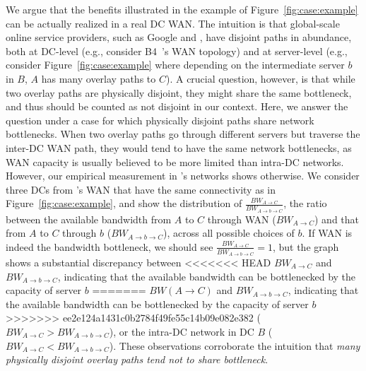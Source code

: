 We argue that the benefits illustrated in the example of
Figure~\ref{fig:case:example} can be actually realized in a
real DC WAN. The intuition is that
global-scale online service providers,
such as Google and \company, have disjoint paths in abundance,
both at DC-level (e.g., consider B4~\cite{b4}'s WAN topology)
and at server-level (e.g., consider Figure~\ref{fig:case:example}
where depending on the intermediate server $b$ in $B$,
$A$ has many overlay paths to $C$).
A crucial question, however, is that while two overlay paths are
physically disjoint, they might share the same bottleneck, and
thus should be counted as not disjoint in our context.
Here, we answer the question under a case for which physically
disjoint paths share network bottlenecks.
When two overlay paths go through different servers but traverse
the inter-DC WAN path, they would tend to have the same network
bottlenecks, as WAN capacity is usually believed to be more
limited than intra-DC networks.
However, our empirical measurement in \company's networks shows
otherwise.
We consider three DCs from \company's WAN that have the same
connectivity as in Figure~\ref{fig:case:example},
and show the distribution of
$\frac{BW_{A\rightarrow C}}{BW_{A\rightarrow b\rightarrow C}}$,
the ratio between the available bandwidth
from $A$ to $C$ through WAN ($BW_{A\rightarrow C}$) and
that from $A$ to $C$ through $b$
($BW_{A\rightarrow b\rightarrow C}$),
across all possible choices of $b$.
If WAN is indeed the bandwidth bottleneck, we should see
$\frac{BW_{A\rightarrow C}}{BW_{A\rightarrow b\rightarrow C}}=1$,
but the graph shows a substantial discrepancy between
<<<<<<< HEAD
$BW_{A\rightarrow C}$ and $BW_{A\rightarrow b\rightarrow C}$,
indicating that the available bandwidth can be bottlenecked by 
the capacity of server $b$ 
=======
$BW(A\rightarrow C)$ and $BW_{A\rightarrow b\rightarrow C}$,
indicating that the available bandwidth can be bottlenecked by
the capacity of server $b$
>>>>>>> ee2e124a1431c0b2784f49fe55c14b09e082e382
($BW_{A\rightarrow C}>BW_{A\rightarrow b\rightarrow C}$),
or the intra-DC network in DC $B$
($BW_{A\rightarrow C}<BW_{A\rightarrow b\rightarrow C}$).
These observations corroborate the intuition that
{\em many physically
disjoint overlay paths tend not to share bottleneck}.

